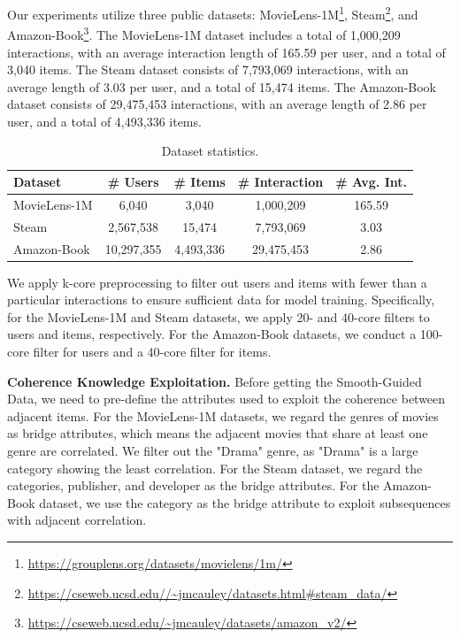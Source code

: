 \documentclass{llmxive}
\begin{document}
Our experiments utilize three public datasets: MovieLens-1M\footnote{\url{https://grouplens.org/datasets/movielens/1m/}}, Steam\footnote{\url{https://cseweb.ucsd.edu//~jmcauley/datasets.html\#steam_data/}}, and Amazon-Book\footnote{\url{https://cseweb.ucsd.edu/~jmcauley/datasets/amazon_v2/}}. The MovieLens-1M dataset includes a total of 1,000,209 interactions, with an average interaction length of 165.59 per user, and a total of 3,040 items. The Steam dataset consists of 7,793,069 interactions, with an average length of 3.03 per user, and a total of 15,474 items. The Amazon-Book dataset consists of 29,475,453 interactions, with an average length of 2.86 per user, and a total of 4,493,336 items.

\begin{table}[t]
 \begin{center}
\begin{tabular}{lcccc}
 \toprule[1.5pt]
 \textbf{Dataset} & \textbf{\# Users} & \textbf{\# Items} & \textbf{\# Interaction} & \textbf{\# Avg. Int.} \\
 \midrule
 MovieLens-1M & 6,040 & 3,040 & 1,000,209 & 165.59\\
 Steam & 2,567,538 & 15,474 & 7,793,069 & 3.03  \\
 Amazon-Book & 10,297,355 & 4,493,336  & 29,475,453 & 2.86  \\
 \bottomrule[1.5pt]
 \end{tabular}
 \end{center}
 
\caption{Dataset statistics.}
\label{tab:dataset_appendix}
\end{table}

We apply k-core preprocessing to filter out users and items with fewer than a particular interactions to ensure sufficient data for model training. Specifically, for the MovieLens-1M and Steam datasets, we apply 20- and 40-core filters to users and items, respectively. For the Amazon-Book datasets, we conduct a 100-core filter for users and a 40-core filter for items. 

\textbf{Coherence Knowledge Exploitation.} Before getting the Smooth-Guided Data, we need to pre-define the attributes used to exploit the coherence between adjacent items. For the MovieLens-1M datasets, we regard the genres of movies as bridge attributes, which means the adjacent movies that share at least one genre are correlated. We filter out the "Drama" genre, as "Drama" is a large category showing the least correlation. For the Steam dataset, we regard the categories, publisher, and developer as the bridge attributes. For the Amazon-Book dataset, we use the category as the bridge attribute to exploit subsequences with adjacent correlation.
\end{document}
